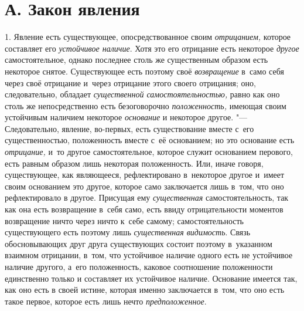 \section[А. Закон явления]{А. Закон явления}
1. Явление есть существующее, опосредствованное
своим {\em отрицанием,} которое составляет его
{\em устойчивое наличие}. Хотя это его отрицание есть
некоторое {\em другое} самостоятельное, однако
последнее столь же существенным образом есть некоторое снятое. Существующее
есть поэтому своё {\em возвращение} в~само себя через
своё отрицание и~через отрицание этого своего отрицания; оно,
следовательно, обладает {\em существенной
самостоятельностью,} равно как оно столь же непосредственно есть
безоговорочно {\em положенность,} имеющая своим
устойчивым наличием некоторое {\em основание} и
некоторое другое. "--- Следовательно, явление, во-первых, есть существование
вместе с~его существенностью, положенность вместе с~её основанием; но это
основание есть {\em отрицание,} и~то другое
самостоятельное, которое служит основанием перового, есть равным образом
лишь некоторая положенность. Или, иначе говоря, существующее, как
являющееся, рефлектировано в~некоторое другое и~имеет своим основанием это
другое, которое само заключается лишь в~том, что оно рефлектировало в
другое. Присущая ему {\em существенная}
самостоятельность, так как она есть возвращение в~себя само, есть ввиду
отрицательности моментов возвращение ничто через ничто к~себе самому;
самостоятельность существующего есть поэтому лишь
{\em существенная видимость}. Связь обосновывающих друг
друга существующих состоит поэтому в~указанном взаимном отрицании, в~том,
что устойчивое наличие одного есть не устойчивое наличие другого, а~его
положенность, каковое соотношение положенности единственно только и
составляет их устойчивое наличие. Основание имеется так, как оно есть в
своей истине, которая именно заключается в~том, что оно есть такое первое,
которое есть лишь нечто {\em предположенное}.

